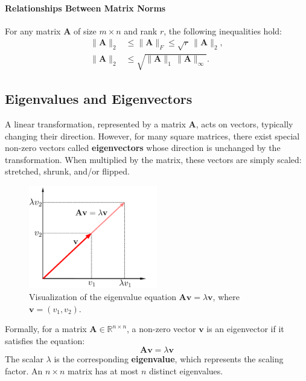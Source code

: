 \paragraph{Relationships Between Matrix Norms}
For any matrix $ \mathbf{A} $ of size $ m \times n $ and rank $ r $, the following inequalities hold:
\begin{align*}
    \|\mathbf{A}\|_2 &\leq \|\mathbf{A}\|_F \leq \sqrt{r}\,\|\mathbf{A}\|_2, \\
    \|\mathbf{A}\|_2 &\leq \sqrt{\|\mathbf{A}\|_1 \, \|\mathbf{A}\|_\infty}.
\end{align*}


\subsection{Eigenvalues and Eigenvectors}
A linear transformation, represented by a matrix $\mathbf{A}$, acts on vectors, typically changing their direction. However, for many square matrices, there exist special non-zero vectors called \textbf{eigenvectors} whose direction is unchanged by the transformation. When multiplied by the matrix, these vectors are simply scaled: stretched, shrunk, and/or flipped.

\begin{figure}[H]
    \centering
    \includegraphics[width=0.5\textwidth]{figs/linear-algebra/eigenvalue_equation.pdf}
    \caption{Visualization of the eigenvalue equation $ \mathbf{A}\mathbf{v} = \lambda \mathbf{v} $, where $\mathbf{v} = (v_1, v_2)$.}
    \label{fig:eigenvalue-equation}
\end{figure}

Formally, for a matrix $\mathbf{A} \in \mathbb{R}^{n\times n}$, a non-zero vector $\mathbf{v}$ is an eigenvector if it satisfies the equation:
$$ \mathbf{A}\mathbf{v} = \lambda \mathbf{v} $$
The scalar $\lambda$ is the corresponding \textbf{eigenvalue}, which represents the scaling factor. An $n \times n$ matrix has at most $n$ distinct eigenvalues.

